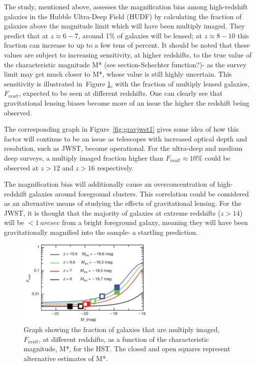 		The study, mentioned above, assesses the magnification bias among high-redshift galaxies in the Hubble Ultra-Deep Field (HUDF) by calculating the fraction of galaxies above the magnitude limit which will have been multiply imaged. They predict that at $z\approx6-7$, around 1\% of galaxies will be lensed; at $z\approx8-10$ this fraction can increase to up to a few tens of percent\cite{wyithestuart2011}. It should be noted that these values are subject to increasing sensitivity, at higher redshifts, to the true value of the characteristic magnitude M* (see section-Schechter function?)- as the survey limit may get much closer to M*, whose value is still highly uncertain. This sensitivity is illustrated in~Figure \ref{fig:gravhst1}, with the fraction of multiply lensed galaxies, $F_{mult}$, expected to be seen at different redshifts. One can clearly see that gravitational lensing biases become more of an issue the higher the redshift being observed.

		The corresponding graph in Figure~\ref{fig:gravjwst1} gives some idea of how this factor will continue to be an issue as telescopes with increased optical depth and resolution, such as JWST, become operational. For the ultra-deep and medium deep surveys, a multiply imaged fraction higher than $F_{mult}\approx10\%$ could be observed at $z>12$ and $z>16$ respectively.

		The magnification bias will additionally cause an overconcentration of high-redshift galaxies around foreground clusters. This correlation could be considered as an alternative means of studying the effects of gravitational lensing. For the JWST, it is thought that the majority of galaxies at extreme redshifts ($z>14$) will be $<1~arcsec$ from a bright foreground galaxy, meaning they will have been gravitationally magnified into the sample- a startling prediction\cite{wyithestuart2011}.
		\begin{figure}
			\centering
			\includegraphics[width=0.6\textwidth]{../Images/gravhst1.JPG}
			\caption{Graph showing the fraction of galaxies that are multiply imaged,  $F_{mult}$, at different redshifts, as a function of the characteristic magnitude, M*, for the HST. The closed and open squares represent alternative estimates of M*.}\label{fig:gravhst1}
		\end{figure}

